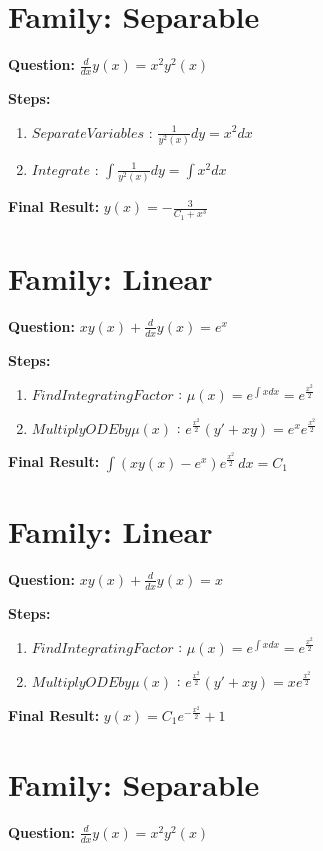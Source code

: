 \documentclass{article}
\begin{document}
\section*{Family: Separable}
\textbf{Question:} $\frac{d}{d x} y{\left(x \right)} = x^{2} y^{2}{\left(x \right)}$

\textbf{Steps:}
\begin{enumerate}
\item $Separate Variables$ :  $\frac{1}{y^{2}{\left(x \right)}} dy = x^{2} dx$
\item $Integrate$ :  $\int \frac{1}{y^{2}{\left(x \right)}} dy = \int x^{2} dx$
\end{enumerate}
\textbf{Final Result:} $y{\left(x \right)} = - \frac{3}{C_{1} + x^{3}}$

\section*{Family: Linear}
\textbf{Question:} $x y{\left(x \right)} + \frac{d}{d x} y{\left(x \right)} = e^{x}$

\textbf{Steps:}
\begin{enumerate}
\item $Find Integrating Factor$ :  $\mu(x) = e^{\int x dx} = e^{\frac{x^{2}}{2}}$
\item $Multiply ODE by \mu(x)$ :  $e^{\frac{x^{2}}{2}}(y' + xy) = e^{x} e^{\frac{x^{2}}{2}}$
\end{enumerate}
\textbf{Final Result:} $\int \left(x y{\left(x \right)} - e^{x}\right) e^{\frac{x^{2}}{2}}\, dx = C_{1}$

\section*{Family: Linear}
\textbf{Question:} $x y{\left(x \right)} + \frac{d}{d x} y{\left(x \right)} = x$

\textbf{Steps:}
\begin{enumerate}
\item $Find Integrating Factor$ :  $\mu(x) = e^{\int x dx} = e^{\frac{x^{2}}{2}}$
\item $Multiply ODE by \mu(x)$ :  $e^{\frac{x^{2}}{2}}(y' + xy) = x e^{\frac{x^{2}}{2}}$
\end{enumerate}
\textbf{Final Result:} $y{\left(x \right)} = C_{1} e^{- \frac{x^{2}}{2}} + 1$

\section*{Family: Separable}
\textbf{Question:} $\frac{d}{d x} y{\left(x \right)} = x^{2} y^{2}{\left(x \right)}$
\end{document}
